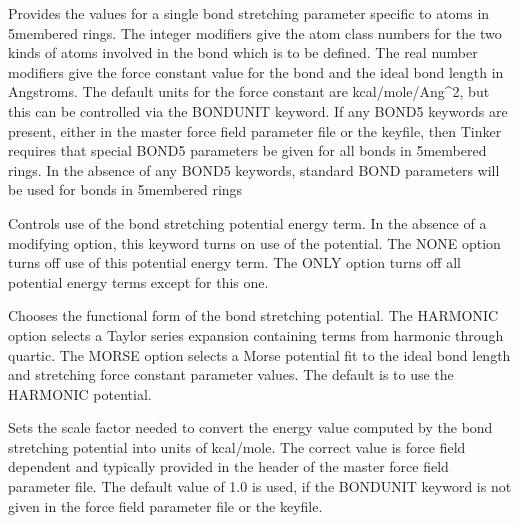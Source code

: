 \documentclass[letterpaper,11pt,english]{sphinxmanual}
\begin{document}
\ignorespaces {}\label{\detokenize{text/keywords:key-bond5}}\begin{description}
\sphinxAtStartPar
Provides the values for a single bond stretching parameter specific to atoms in 5\sphinxhyphen{}membered rings. The integer modifiers give the atom class numbers for the two kinds of atoms involved in the bond which is to be defined. The real number modifiers give the force constant value for the bond and the ideal bond length in Angstroms. The default units for the force constant are kcal/mole/Ang\textasciicircum{}2, but this can be controlled via the BONDUNIT keyword. If any BOND5 keywords are present, either in the master force field parameter file or the keyfile, then Tinker requires that special BOND5 parameters be given for all bonds in 5\sphinxhyphen{}membered rings. In the absence of any BOND5 keywords, standard BOND parameters will be used for bonds in 5\sphinxhyphen{}membered rings

\end{description}

\ignorespaces {}\label{\detokenize{text/keywords:key-bondterm}}\begin{description}
\sphinxAtStartPar
Controls use of the bond stretching potential energy term. In the absence of a modifying option, this keyword turns on use of the potential. The NONE option turns off use of this potential energy term. The ONLY option turns off all potential energy terms except for this one.

\end{description}

\ignorespaces {}\label{\detokenize{text/keywords:key-bondtype}}\begin{description}
\sphinxAtStartPar
Chooses the functional form of the bond stretching potential. The HARMONIC option selects a Taylor series expansion containing terms from harmonic through quartic. The MORSE option selects a Morse potential fit to the ideal bond length and stretching force constant parameter values. The default is to use the HARMONIC potential.

\end{description}

\ignorespaces {}\label{\detokenize{text/keywords:key-bondunit}}\begin{description}
\sphinxAtStartPar
Sets the scale factor needed to convert the energy value computed by the bond stretching potential into units of kcal/mole. The correct value is force field dependent and typically provided in the header of the master force field parameter file. The default value of 1.0 is used, if the BONDUNIT keyword is not given in the force field parameter file or the keyfile.

\end{description}
\end{document}
